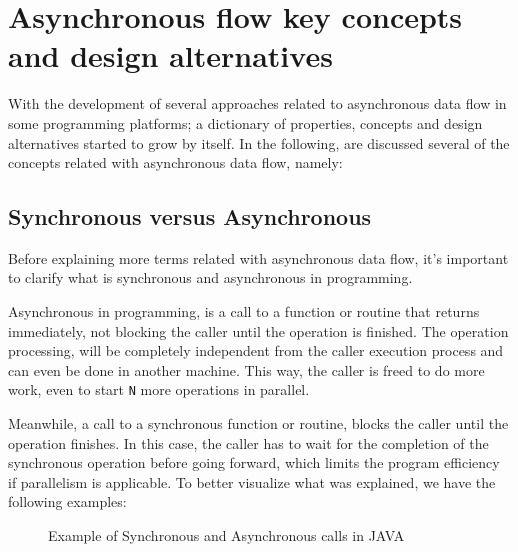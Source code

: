 

\section{Asynchronous flow key concepts and design alternatives} %
\label{sec:async_concepts}

With the development of several approaches related to asynchronous data flow in some programming platforms; a dictionary
of properties, concepts and design alternatives started to grow by itself. In the following, are discussed several of the concepts related with asynchronous data flow, namely:

\subsection{Synchronous versus Asynchronous}
	Before explaining more terms related with asynchronous data flow, it's important to clarify what is synchronous and asynchronous in programming. 
	
	Asynchronous in programming, is a call to a function or routine that returns immediately, not blocking the caller until the operation is finished. The operation processing, will be completely independent from the caller execution process and can even be done in another machine. This way, the caller is freed to do more work, even to start \texttt{N} more operations in parallel. 
	
	Meanwhile, a call to a synchronous function or routine, blocks the caller until the operation finishes. In this case, the caller has to wait for the completion of the synchronous operation before going forward, which limits the program efficiency if parallelism is applicable.
	To better visualize what was explained, we have the following examples: 
	
	\begin{figure}[H]
		\begin{subfigure}[h]{0.5\textwidth}
			\label{fig:ra-vectorial}
		 \end{subfigure}	
	\qquad
		 \begin{subfigure}[h]{0.5\textwidth}
			\label{fig:ra-raster}
		\end{subfigure}		
	  \caption{Example of Synchronous and Asynchronous calls in JAVA}
	  \label{fig:figura-completa}
	\end{figure}
	
